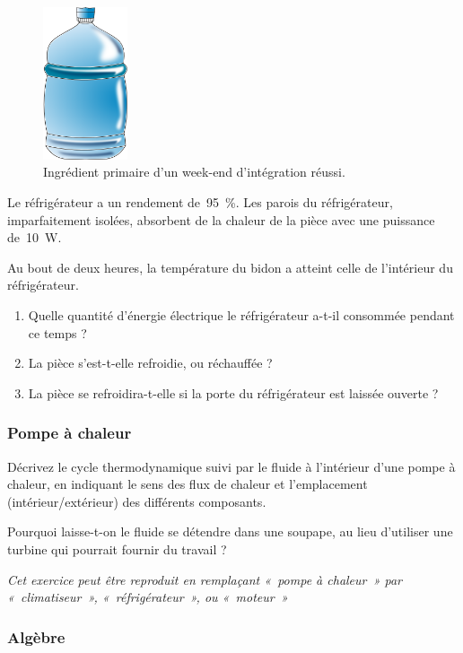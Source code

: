 	\begin{figure}[htp] %
		\begin{center}
		\includegraphics[width=2.5cm]{images/bottle.png}
		\end{center}
		\caption{Ingrédient primaire d’un week-end d’intégration réussi.}
		\label{fig_bidon_eau}
	\end{figure}
	
	
	Le réfrigérateur a un rendement de~\SI{95}{\percent}. Les parois du réfrigérateur, imparfaitement isolées, absorbent de la chaleur de la pièce avec une puissance de~\SI{10}{\watt}.
	
	Au bout de deux heures, la température du bidon a atteint celle de l’intérieur du réfrigérateur.
	
	\begin{enumerate}
		\item Quelle quantité d’énergie électrique le réfrigérateur a-t-il consommée pendant ce temps ?
		\item La pièce s’est-t-elle refroidie, ou réchauffée ?
		\item La pièce se refroidira-t-elle si la porte du réfrigérateur est laissée ouverte ?
	\end{enumerate}


\subsubsection{Pompe à chaleur}

	Décrivez le cycle thermodynamique suivi par le fluide à l’intérieur d’une pompe à chaleur, en indiquant le sens des flux de chaleur et l’emplacement (intérieur/extérieur) des différents composants.
	
	Pourquoi laisse-t-on le fluide se détendre dans une soupape, au lieu d’utiliser une turbine qui pourrait fournir du travail ?
	
	{\small\textit{Cet exercice peut être reproduit en remplaçant «~pompe à chaleur~» par «~climatiseur~», «~réfrigérateur~», ou «~moteur~»}}

\subsubsection{Algèbre}

